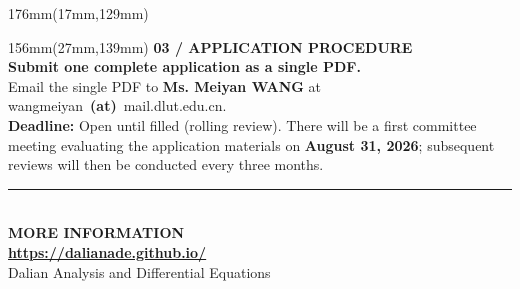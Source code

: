 \documentclass[10pt]{article}
\newcommand{\FirstReviewDate}{August 31, 2026}
\newcommand{\EmailUser}{wangmeiyan}
\newcommand{\EmailDomain}{mail.dlut.edu.cn}
\newcommand{\Website}{https://dalianade.github.io/}
\newcommand{\ObfuscatedEmail}{\EmailUser\ \textbf{(at)}\ \EmailDomain}
\newcommand{\YellowKicker}[1]{%
  {\color{DLADEYellow}\bfseries\fontsize{8.1}{10}\selectfont\MakeUppercase{#1}}%
}
\begin{document}
\begin{textblock*}{176mm}(17mm,129mm)
\end{textblock*}
\begin{textblock*}{156mm}(27mm,139mm)
  \YellowKicker{03 / Application procedure}\\[4mm]
  {\DisplayFont\bfseries\color{white}\fontsize{20.5}{24}\selectfont
  Submit one complete application as a single PDF.}\\[4mm]
  {\color{white}\fontsize{9}{13}\selectfont
  Email the single PDF to \textbf{Ms. Meiyan WANG} at
  {\color{DLADEYellow}\ObfuscatedEmail}.}\\[4mm]
  {\color{DLADEWhiteMuted}\fontsize{8.8}{12.5}\selectfont
  \textbf{Deadline:} Open until filled (rolling review). There will be a first committee meeting
  evaluating the application materials on \textbf{\FirstReviewDate}; subsequent reviews will then be
  conducted every three months.}

  \vspace{6mm}\color{DLADEHeaderMuted}\rule{156mm}{.2mm}\\[5mm]
  \YellowKicker{More information}\\[3mm]
  {\color{white}\bfseries\fontsize{10}{12}\selectfont\href{\Website}{\Website}}\\[1.5mm]
  {\color{DLADEHeaderMuted}\fontsize{7.8}{9}\selectfont Dalian Analysis and Differential Equations}
\end{textblock*}
\end{document}
